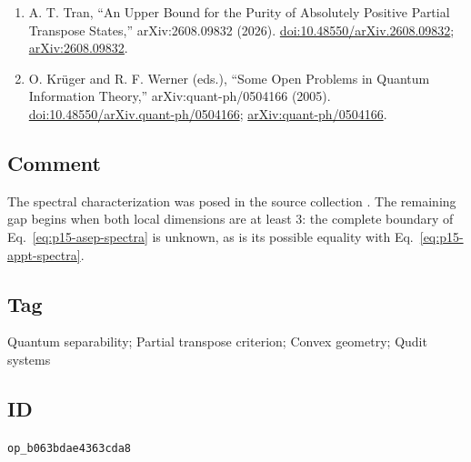 \begin{enumerate}[label={},leftmargin=4.8em,labelsep=0.5em]
  \item[\textup{[Tra26]}]\label{ref:p15-tran}
  A. T. Tran,
  ``An Upper Bound for the Purity of Absolutely Positive Partial Transpose
  States,'' arXiv:2608.09832 (2026).
  \href{https://doi.org/10.48550/arXiv.2608.09832}%
       {doi:10.48550/arXiv.2608.09832};
  \href{https://arxiv.org/abs/2608.09832}{arXiv:2608.09832}.

  \item[\textup{[KW05]}]\label{ref:p15-krueger-werner}
  O. Krüger and R. F. Werner (eds.),
  ``Some Open Problems in Quantum Information Theory,''
  arXiv:quant-ph/0504166 (2005).
  \href{https://doi.org/10.48550/arXiv.quant-ph/0504166}%
       {doi:10.48550/arXiv.quant-ph/0504166};
  \href{https://arxiv.org/abs/quant-ph/0504166}%
       {arXiv:quant-ph/0504166}.
\end{enumerate}

\subsection*{Comment}

The spectral characterization was posed in the source collection
.  The remaining gap begins when both
local dimensions are at least $3$: the complete boundary of
Eq.~\eqref{eq:p15-asep-spectra} is unknown, as is its possible equality with
Eq.~\eqref{eq:p15-appt-spectra}.

\subsection*{Tag}

Quantum separability; Partial transpose criterion; Convex geometry;
Qudit systems

\subsection*{ID}

\texttt{op\_b063bdae4363cda8}
